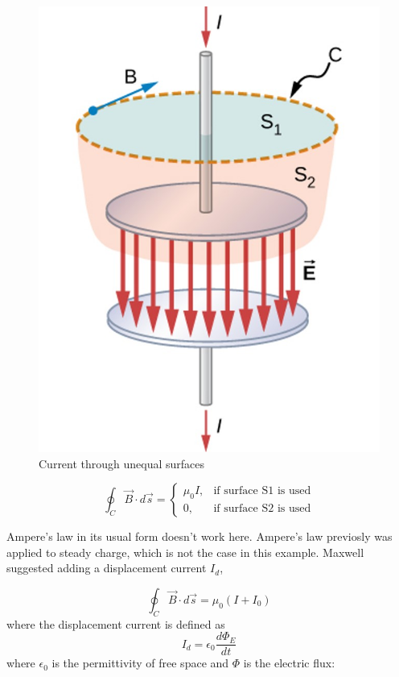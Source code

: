 \documentclass[14pt]{memoir}
\begin{document}
\begin{figure}[H]
\begin{center}
\includegraphics[scale=0.5]{fig/fig_16_03.jpg}
\caption{Current through unequal surfaces}
\label{fig:16_03}
\end{center}
\end{figure}

\begin{equation}
\oint_C \vec{B} \cdot d\vec{s} = \begin{cases}
\mu_0 I, & \text{if surface S1 is used} \\
0, & \text{if surface S2 is used}
\end{cases}
\end{equation}

Ampere's law in its usual form doesn't work here. Ampere's law previosly was applied to steady charge, which is not the case in this example. Maxwell suggested adding a displacement current $I_d$,

\begin{equation}
\oint_C \vec{B} \cdot d\vec{s} = \mu_0 (I + I_0) 
\end{equation}
where the displacement current is defined as 
\begin{equation}
I_d = \epsilon_0 \frac{d\Phi_E}{dt}
\end{equation}
where $\epsilon_0$ is the permittivity of free space and $\Phi$ is the electric flux:
\end{document}
